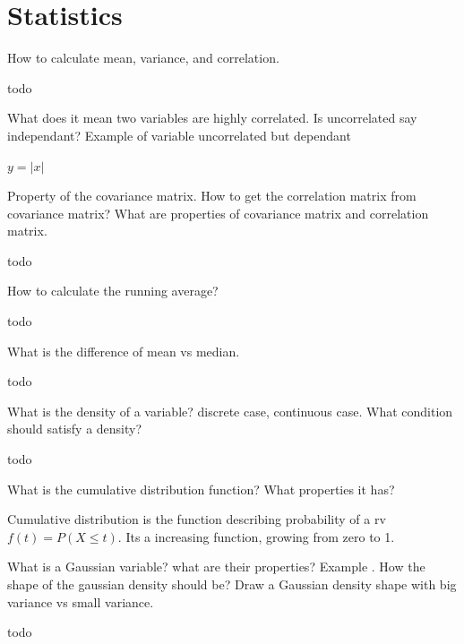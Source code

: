 \documentclass{exam}%
\begin{document}
\section{Statistics}
\begin{questions}

\question How to calculate mean, variance, and correlation.
\begin{solution}[.2in]
	todo
\end{solution}

\question What does it mean two variables are highly correlated. Is uncorrelated say independant? Example of variable uncorrelated but dependant
\begin{solution}[.2in]
	$y=|x|$
\end{solution}

\question Property of the covariance matrix. How to get the correlation matrix from covariance matrix? What are properties of covariance matrix and correlation matrix.
\begin{solution}[.2in]
	todo
\end{solution}

\question How to calculate the running average?
\begin{solution}[.2in]
	todo
\end{solution}

\question What is the difference of mean vs median.
\begin{solution}[.2in]
	todo
\end{solution}

\question What is the density of a variable? discrete case, continuous case. What condition should satisfy a density?
\begin{solution}[.2in]
	todo
\end{solution}

\question What is the cumulative distribution function? What properties it has?
\begin{solution}[.2in]
Cumulative distribution is the function describing probability of a rv $f(t) = P(X\leq t)$. Its a increasing function, growing from zero to 1.
\end{solution}

\question What is a Gaussian variable? what are their properties? Example . How the shape of the gaussian density should be?  Draw a Gaussian density shape with big variance vs small variance.
\begin{solution}[.2in]
	todo
\end{solution}


\end{questions}
\end{document}
